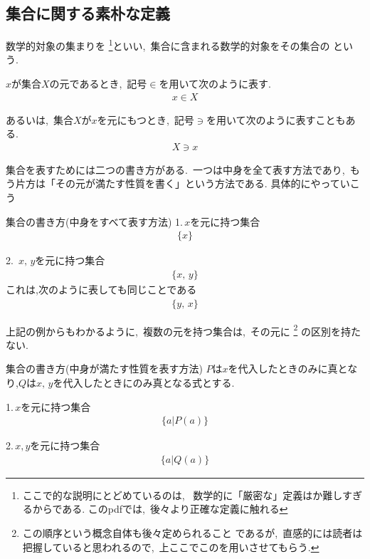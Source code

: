 \documentclass[hyperref,a4paper,12pt]{kininaruki}
\begin{document}
\subsection{集合に関する素朴な定義}
数学的対象の集まりを
\footnote{ここで的な説明にとどめているのは,%
\, 数学的に「厳密な」定義はか難しすぎるからである.
このpdfでは,\, 後々より正確な定義に触れる}といい,\, 
集合に含まれる数学的対象をその集合の
という.
\begin{shadebox}
    $x$が集合$X$の元であるとき,\, 記号$\in$を用いて次のように表す.
    \begin{align}
        x\in X
    \end{align}
    \begin{boxnote}
    あるいは,\, 集合$X$が$x$を元にもつとき,\, 記号$\ni$を用いて次のように表すこともある.
    \begin{align}
        X\ni x
    \end{align}
    \end{boxnote}
\end{shadebox}
集合を表すためには二つの書き方がある.\, 一つは中身を全て表す方法であり,\, %
もう片方は「その元が満たす性質を書く」という方法である.
具体的にやっていこう
\emptyline
\begin{itembox}[l]{集合の書き方(中身をすべて表す方法)}
    1.\,$x$を元に持つ集合
    \begin{align}
        \{x\}
    \end{align}

    2.\, $x,\, y$を元に持つ集合
    \begin{align}
        \{x,\, y\}
    \end{align}
    これは,次のように表しても同じことである
    \begin{align}
        \{y,\, x\}
    \end{align}
\end{itembox}
上記の例からもわかるように,\, 複数の元を持つ集合は,\, その元に
\footnote{この順序という概念自体も後々定められること
であるが,\, 直感的には読者は把握していると思われるので,\, 
上ここでこのを用いさせてもらう.}
の区別を持たない.
\newpage
\begin{itembox}[l]{集合の書き方(中身が満たす性質を表す方法)}
    $P$は$x$を代入したときのみに真となり,$Q$は$x,\, y$を代入したときにのみ真となる式とする.


    1.\,$x$を元に持つ集合
    \begin{align}
        \{a|P(a)\}
    \end{align}

    2.\,$x,y$を元に持つ集合
    \begin{align}
        \{a|Q(a)\}
    \end{align}
\end{itembox}
\end{document}
